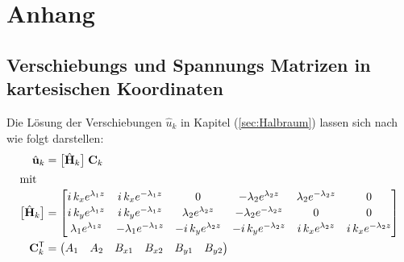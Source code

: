 \chapter{Anhang}
\label{cha:anhang}

\section{Verschiebungs und Spannungs Matrizen in kartesischen Koordinaten}
\label{cha:Halbraum}

Die Lösung der Verschiebungen \(\hat{u}_{k}\) in Kapitel (\ref{sec:Halbraum}) lassen sich nach \cite{Fruehe2010} wie folgt darstellen:
\begin{subequations}\label{eq:uHc_block}
	{%
		\begin{align}
			\hat{\mathbf{u}}_{k} &= \bigl[\hat{\mathbf{H}}_{k}\bigr]\;\mathbf{C}_{k}
			\label{eq:uHc_main}\\
			\intertext{mit}
			\bigl[\hat{\mathbf{H}}_{k}\bigr] &=
			\begin{bmatrix}
				i\,k_{x}e^{\lambda_{1}z} & i\,k_{x}e^{-\lambda_{1}z} & 0
				& -\lambda_{2}e^{\lambda_{2}z} & \lambda_{2}e^{-\lambda_{2}z} & 0 \\[2pt]
				i\,k_{y}e^{\lambda_{1}z} & i\,k_{y}e^{-\lambda_{1}z} & \lambda_{2}e^{\lambda_{2}z}
				& -\lambda_{2}e^{-\lambda_{2}z} & 0 & 0 \\[2pt]
				\lambda_{1}e^{\lambda_{1}z} & -\lambda_{1}e^{-\lambda_{1}z} & -i\,k_{y}e^{\lambda_{2}z}
				& -i\,k_{y}e^{-\lambda_{2}z} & i\,k_{x}e^{\lambda_{2}z} & i\,k_{x}e^{-\lambda_{2}z}
			\end{bmatrix}
			\label{eq:Hk_def}\\
			\mathbf{C}_{k}^{\mathsf T} &= \begin{pmatrix}
				A_1 & A_2 & B_{x1} & B_{x2} & B_{y1} & B_{y2}
			\end{pmatrix}
			\label{eq:Ck_row}
		\end{align}
	}%
\end{subequations}

